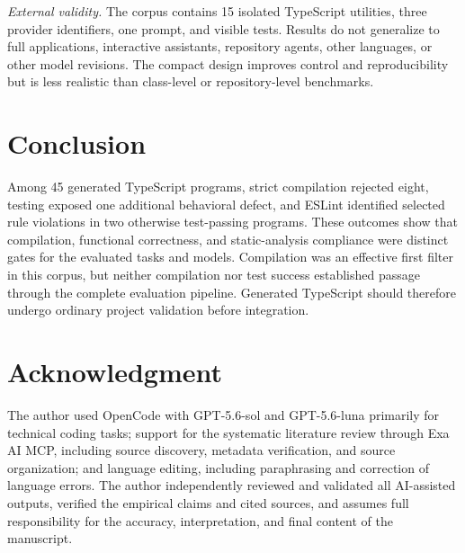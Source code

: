 \documentclass[conference]{IEEEtran}
\begin{document}
\textit{External validity.} The corpus contains 15 isolated TypeScript utilities, three provider identifiers, one prompt, and visible tests. Results do not generalize to full applications, interactive assistants, repository agents, other languages, or other model revisions. The compact design improves control and reproducibility but is less realistic than class-level or repository-level benchmarks.

\section{Conclusion}
Among 45 generated TypeScript programs, strict compilation rejected eight, testing exposed one additional behavioral defect, and ESLint identified selected rule violations in two otherwise test-passing programs. These outcomes show that compilation, functional correctness, and static-analysis compliance were distinct gates for the evaluated tasks and models. Compilation was an effective first filter in this corpus, but neither compilation nor test success established passage through the complete evaluation pipeline. Generated TypeScript should therefore undergo ordinary project validation before integration.

\section*{Acknowledgment}
The author used OpenCode with GPT-5.6-sol and GPT-5.6-luna primarily for technical coding tasks; support for the systematic literature review through Exa AI MCP, including source discovery, metadata verification, and source organization; and language editing, including paraphrasing and correction of language errors. The author independently reviewed and validated all AI-assisted outputs, verified the empirical claims and cited sources, and assumes full responsibility for the accuracy, interpretation, and final content of the manuscript.




\end{document}
